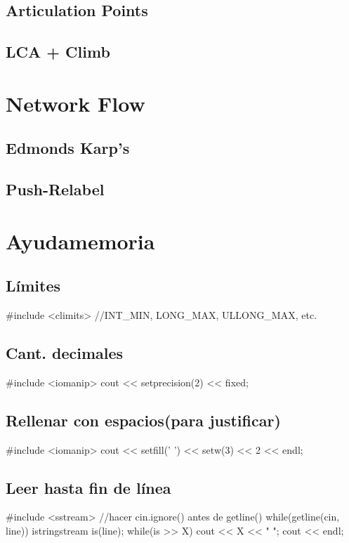 \subsection{Articulation Points}
\subsection{LCA + Climb}
\section{Network Flow}
\subsection{Edmonds Karp’s}
\subsection{Push-Relabel}


\section{Ayudamemoria}%
\subsection*{Límites}
\begin{code}
#include <climits> //INT_MIN, LONG_MAX, ULLONG_MAX, etc.
\end{code}
\subsection*{Cant. decimales}
\begin{code}
#include <iomanip>
cout << setprecision(2) << fixed;
\end{code}
\subsection*{Rellenar con espacios(para justificar)}
\begin{code}
#include <iomanip>
cout << setfill(' ') << setw(3) << 2 << endl;
\end{code}
\subsection*{Leer hasta fin de línea}
\begin{code}
#include <sstream>
//hacer cin.ignore() antes de getline()
while(getline(cin, line)){
   	 istringstream is(line);
   	 while(is >> X)
   		 cout << X << " ";
   	 cout << endl;
}
\end{code}
